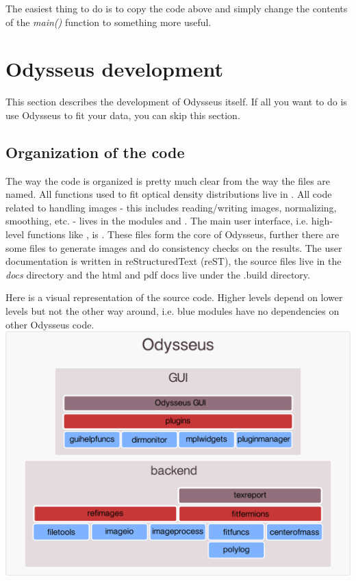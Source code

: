 \documentclass[letterpaper,10pt,english]{manual}
\begin{document}
The easiest thing to do is to copy the code above and simply change the contents
of the \emph{main()} function to something more useful.

\resetcurrentobjects
\hypertarget{--doc-development}{}

\section{Odysseus development}

This section describes the development of Odysseus itself. If all you want to do is use Odysseus to fit your data, you can skip this section.


\subsection{Organization of the code}

The way the code is organized is pretty much clear from the way the files are named. All functions used to fit optical density distributions live in . All code related to handling images - this includes reading/writing images, normalizing, smoothing, etc. - lives in the modules  and . The main user interface, i.e. high-level functions like , is . These files form the core of Odysseus, further there are some files to generate images and do consistency checks on the results. The user documentation is written in reStructuredText (reST), the source files live in the \emph{docs} directory and the html and pdf docs live under the .build directory.

Here is a visual representation of the source code. Higher levels depend on lower levels but not the other way around, i.e. blue modules have no dependencies on other Odysseus code.
\includegraphics[width=500pt]{dependency_graph.png}
\end{document}
